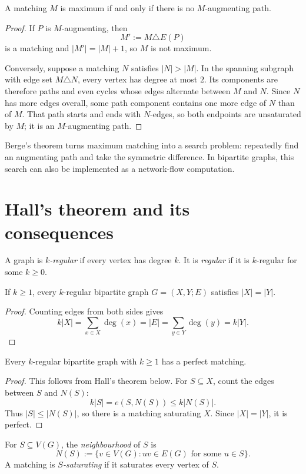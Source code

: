 \begin{notetheorem}
A matching $M$ is maximum if and only if there is no $M$-augmenting path.
\end{notetheorem}
\begin{proof}
If $P$ is $M$-augmenting, then
\[
  M':=M\triangle E(P)
\]
is a matching and $|M'|=|M|+1$, so $M$ is not maximum.

Conversely, suppose a matching $N$ satisfies $|N|>|M|$.  In the spanning
subgraph with edge set $M\triangle N$, every vertex has degree at most $2$.
Its components are therefore paths and even cycles whose edges alternate
between $M$ and $N$.  Since $N$ has more edges overall, some path component
contains one more edge of $N$ than of $M$.  That path starts and ends with
$N$-edges, so both endpoints are unsaturated by $M$; it is an
$M$-augmenting path.
\end{proof}

\begin{noteremark}
Berge's theorem turns maximum matching into a search problem: repeatedly find
an augmenting path and take the symmetric difference.  In bipartite graphs,
this search can also be implemented as a network-flow computation.
\end{noteremark}
\section{Hall's theorem and its consequences}

\begin{notedefinition}
A graph is \emph{$k$-regular} if every vertex has degree $k$.  It is
\emph{regular} if it is $k$-regular for some $k\ge0$.
\end{notedefinition}

\begin{noteproposition}
If $k\ge1$, every $k$-regular bipartite graph $G=(X,Y;E)$ satisfies
$|X|=|Y|$.
\end{noteproposition}
\begin{proof}
Counting edges from both sides gives
\[
  k|X|=\sum_{x\in X}\deg(x)=|E|
  =\sum_{y\in Y}\deg(y)=k|Y|.
\]
\end{proof}

\begin{notetheorem}
Every $k$-regular bipartite graph with $k\ge1$ has a perfect matching.
\end{notetheorem}
\begin{proof}
This follows from Hall's theorem below.  For $S\subseteq X$, count the edges
between $S$ and $N(S)$:
\[
  k|S|
  =e(S,N(S))
  \le k|N(S)|.
\]
Thus $|S|\le|N(S)|$, so there is a matching saturating $X$.  Since
$|X|=|Y|$, it is perfect.
\end{proof}
\begin{notedefinition}
For $S\subseteq V(G)$, the \emph{neighbourhood} of $S$ is
\[
  N(S):=\{v\in V(G):uv\in E(G)\text{ for some }u\in S\}.
\]
A matching is \emph{$S$-saturating} if it saturates every vertex of $S$.
\end{notedefinition}

